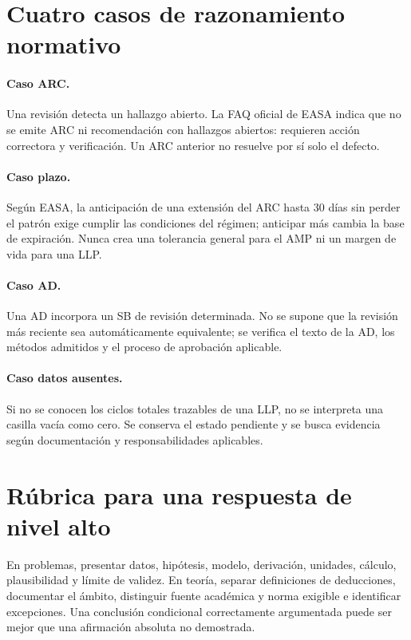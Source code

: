 \section{Cuatro casos de razonamiento normativo}
\paragraph{Caso ARC.} Una revisión detecta un hallazgo abierto. La FAQ oficial de EASA indica que no se emite ARC ni recomendación con hallazgos abiertos: requieren acción correctora y verificación. Un ARC anterior no resuelve por sí solo el defecto.
\paragraph{Caso plazo.} Según EASA, la anticipación de una extensión del ARC hasta 30 días sin perder el patrón exige cumplir las condiciones del régimen; anticipar más cambia la base de expiración. Nunca crea una tolerancia general para el AMP ni un margen de vida para una LLP.
\paragraph{Caso AD.} Una AD incorpora un SB de revisión determinada. No se supone que la revisión más reciente sea automáticamente equivalente; se verifica el texto de la AD, los métodos admitidos y el proceso de aprobación aplicable.
\paragraph{Caso datos ausentes.} Si no se conocen los ciclos totales trazables de una LLP, no se interpreta una casilla vacía como cero. Se conserva el estado pendiente y se busca evidencia según documentación y responsabilidades aplicables.

\section{Rúbrica para una respuesta de nivel alto}
En problemas, presentar datos, hipótesis, modelo, derivación, unidades, cálculo, plausibilidad y límite de validez. En teoría, separar definiciones de deducciones, documentar el ámbito, distinguir fuente académica y norma exigible e identificar excepciones. Una conclusión condicional correctamente argumentada puede ser mejor que una afirmación absoluta no demostrada.

